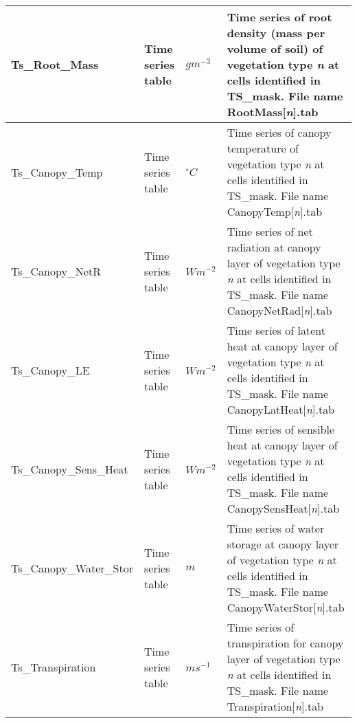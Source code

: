 \begin{longtable}{|p{4cm} l l p{5.5cm}|}
\hline
Ts\_Root\_Mass& Time series table & $ gm^{-3} $ & Time series of root density (mass per volume of soil) of vegetation type \textit{n} at cells identified in \textsf{TS\_mask}. File name \textsf{RootMass[\textit{n}].tab}\\
\hline
Ts\_Canopy\_Temp& Time series table & $ ^{\circ}C $ & Time series of canopy temperature of vegetation type \textit{n} at cells identified in \textsf{TS\_mask}. File name \textsf{CanopyTemp[\textit{n}].tab}\\
\hline
Ts\_Canopy\_NetR& Time series table & $ Wm^{-2} $ & Time series of net radiation at canopy layer of vegetation type \textit{n} at cells identified in \textsf{TS\_mask}. File name \textsf{CanopyNetRad[\textit{n}].tab}\\
\hline
Ts\_Canopy\_LE& Time series table & $ Wm^{-2} $ & Time series of latent heat at canopy layer of vegetation type \textit{n} at cells identified in \textsf{TS\_mask}. File name \textsf{CanopyLatHeat[\textit{n}].tab}\\
\hline
Ts\_Canopy\_Sens\_Heat & Time series table & $ Wm^{-2} $ & Time series of sensible heat at canopy layer of vegetation type \textit{n} at cells identified in \textsf{TS\_mask}. File name \textsf{CanopySensHeat[\textit{n}].tab}\\
\hline
Ts\_Canopy\_Water\_Stor & Time series table & $ m $ & Time series of water storage at canopy layer of vegetation type \textit{n} at cells identified in \textsf{TS\_mask}. File name \textsf{CanopyWaterStor[\textit{n}].tab}\\
\hline
Ts\_Transpiration & Time series table & $ ms^{-1} $ & Time series of transpiration for canopy layer of vegetation type \textit{n} at cells identified in \textsf{TS\_mask}. File name \textsf{Transpiration[\textit{n}].tab}\\


\hline 
\end{longtable}
